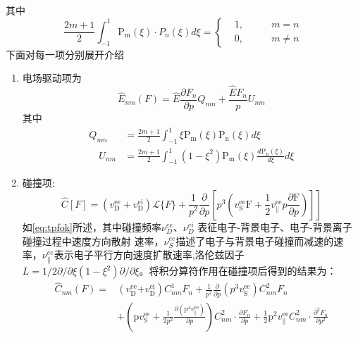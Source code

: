 其中
\begin{equation}
\frac{2 m+1}{2} \int_{-1}^{1} \mathrm{P}_{\mathrm{m}}(\xi)\cdot P_n(\xi) d \xi=\left\{\begin{alignedat}{2}
&1,& \qquad m=n \\
&0,& \qquad m\neq n 
    \end{alignedat}
  \right.
\end{equation}
下面对每一项分别展开介绍
\begin{enumerate}
\item
电场驱动项为
\begin{equation}
\hat{E}_{n m}(F)=\hat{E} \frac{\partial F_{n}}{\partial p} Q_{n m}+\frac{\hat{E} F_{n}}{p} U_{n m}
\end{equation}
其中
\begin{align}Q_{n m} & = \frac{2 m+1}{2} \int_{-1}^{1} \xi \mathrm{P}_{\mathrm{m}}(\xi) \mathrm{P}_{\mathrm{n}}(\xi) d \xi\\ \quad U_{n m} & = \frac{2 m+1}{2} \int_{-1}^{1}\left(1-\xi^{2}\right) \mathrm{P}_{\mathrm{m}}(\xi) \frac{d \mathrm{P}_{\mathrm{n}}(\xi)}{d \xi} d \xi\end{align}
\item
碰撞项\cite{RN2025}:
\begin{equation}
\left.\hat{C}[F] = \left(v_{\mathrm{D}}^{\mathrm{ee}}+v_{\mathrm{D}}^{\mathrm{ei}}\right) \mathcal{L}\{F\}+\frac{1}{p^{2}} \frac{\partial}{\partial p}\left[p^{3}\left(v_{\mathrm{S}}^{\mathrm{ee}} \mathrm{F}+\frac{1}{2} v_{\|}^{\mathrm{ee}} p \frac{\partial \mathrm{F}}{\partial p}\right)\right]\right]
\end{equation}
如\autoref{eq:tpfok}所述，其中碰撞频率$\nu_D^{ee}$、$\nu_D^{ei}$ 表征电子-背景电子、电子-背景离子碰撞过程中速度方向散射
速率，$\nu_S^{ee}$描述了电子与背景电子碰撞而减速的速率，$\nu_{∥}^{ee}$表示电子平行方向速度扩散速率,洛伦兹因子$L=1/2∂/∂ξ(1-ξ^2 )∂/∂ξ$。将积分算符作用在碰撞项后得到的结果为：
\begin{equation}\label{eq:coillnm}
\begin{aligned}\hat{C}_{n m}(F)= &\left(v_{\mathrm{D}}^{\mathrm{ee}}\right. \left.+v_{\mathrm{D}}^{\mathrm{ei}}\right) C_{n m}^{1} F_{n}+\frac{1}{p^{2}} \frac{\partial}{\partial p}\left(p^{3} v_{\mathrm{S}}^{\mathrm{ee}}\right) C_{n m}^{2} F_{n} \\& +\left(\mathrm{p} v_{\mathrm{S}}^{\mathrm{ee}}+\frac{1}{2 p^{2}} \frac{\partial\left(\mathrm{p}^{4} v_{\|}^{\mathrm{ee}}\right)}{\partial p}\right) C_{n m}^{2} \cdot \frac{\partial F_{n}}{\partial p}+\frac{1}{2} \mathrm{p}^{2} v_{\|}^{\mathrm{ee}} C_{n m}^{2} \cdot \frac{\partial^{2} F_{n}}{\partial p^{2}}\end{aligned}

\end{equation}
\end{enumerate}
